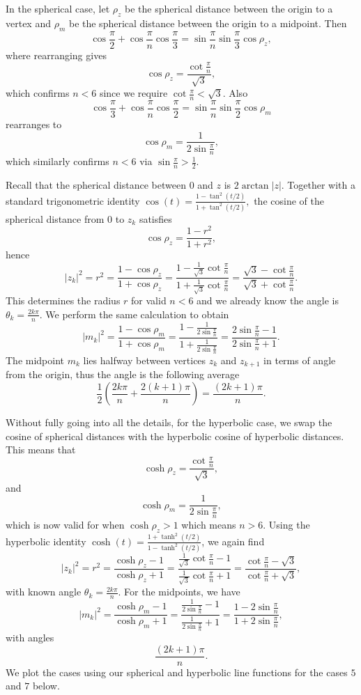 \documentclass{article}
\begin{document}
In the spherical case, let \(\rho_z\) be the spherical distance between the origin to a vertex and \(\rho_m\) be the spherical distance between the origin to a midpoint. Then
\[ \cos\frac{\pi}{2} + \cos\frac{\pi}{n}\cos\frac{\pi}{3} = \sin\frac{\pi}{n}\sin\frac{\pi}{3}\cos\rho_z, \]
where rearranging gives
\[ \cos\rho_z = \frac{\cot\frac{\pi}{n}}{\sqrt{3}}, \]
which confirms \(n < 6\) since we require \(\cot\frac{\pi}{n} < \sqrt{3}\). Also
\[ \cos\frac{\pi}{3} + \cos\frac{\pi}{n}\cos\frac{\pi}{2} = \sin\frac{\pi}{n}\sin\frac{\pi}{2}\cos\rho_m \]
rearranges to
\[ \cos\rho_m = \frac{1}{2\sin\frac{\pi}{n}}, \]
which similarly confirms \(n < 6\) via \(\sin\frac{\pi}{n} > \frac{1}{2}\). 

Recall that the spherical distance between \(0\) and \(z\) is \(2\arctan|z|\). Together with a standard trigonometric identity 
\(\cos(t) = \frac{1 - \tan^2(t/2)}{1 + \tan^2(t/2)}, \)
the cosine of the spherical distance from \(0\) to \(z_k\) satisfies
\[ \cos\rho_z = \frac{1-r^2}{1+r^2}, \]
hence
\[ |z_k|^2 = r^2 = \frac{1 - \cos\rho_z}{1 + \cos\rho_z} = \frac{1 - \frac{1}{\sqrt{3}}\cot\frac{\pi}{n}}{1 + \frac{1}{\sqrt{3}}\cot\frac{\pi}{n}} = \frac{\sqrt{3} - \cot\frac{\pi}{n}}{\sqrt{3} + \cot\frac{\pi}{n}}. \]
This determines the radius \(r\) for valid \(n < 6\) and we already know the angle is \(\theta_k = \frac{2k\pi}{n}\). We perform the same calculation to obtain
\[ |m_k|^2 = \frac{1 - \cos\rho_m}{1 + \cos\rho_m} = \frac{1 - \frac{1}{2\sin\frac{\pi}{n}}}{1 + \frac{1}{2\sin\frac{\pi}{n}}} = \frac{2\sin\frac{\pi}{n} - 1}{2\sin\frac{\pi}{n} + 1}. \]
The midpoint \(m_k\) lies halfway between vertices \(z_k\) and \(z_{k+1}\) in terms of angle from the origin, thus the angle is the following average
\[ \frac{1}{2} \left(\frac{2k\pi}{n} + \frac{2(k+1)\pi}{n}\right) = \frac{(2k+1)\pi}{n}. \]

Without fully going into all the details, for the hyperbolic case, we swap the cosine of spherical distances with the hyperbolic cosine of hyperbolic distances. This means that
\[ \cosh\rho_z = \frac{\cot\frac{\pi}{n}}{\sqrt{3}}, \]
and 
\[ \cosh\rho_m = \frac{1}{2\sin\frac{\pi}{n}}, \]
which is now valid for when \(\cosh\rho_z > 1\) which means \(n > 6\). Using the hyperbolic identity \(\cosh(t) = \frac{1+\tanh^2(t/2)}{1-\tanh^2(t/2)}\), we again find
\[ |z_k|^2 = r^2 = \frac{\cosh\rho_z - 1}{\cosh\rho_z + 1} = \frac{\frac{1}{\sqrt{3}}\cot\frac{\pi}{n} - 1}{\frac{1}{\sqrt{3}}\cot\frac{\pi}{n} + 1} = \frac{\cot\frac{\pi}{n} - \sqrt{3}}{\cot\frac{\pi}{n} + \sqrt{3}}, \]
with known angle \(\theta_k = \frac{2k\pi}{n}\). For the midpoints, we have
\[ |m_k|^2 = \frac{\cosh\rho_m - 1}{\cosh\rho_m + 1} = \frac{\frac{1}{2\sin\frac{\pi}{n}} - 1}{\frac{1}{2\sin\frac{\pi}{n}} + 1} = \frac{1 - 2\sin\frac{\pi}{n}}{1 + 2\sin\frac{\pi}{n}}, \]
with angles 
\[ \frac{(2k + 1)\pi}{n}. \]
We plot the cases using our spherical and hyperbolic line functions for the cases \(5\) and \(7\) below.
\end{document}
